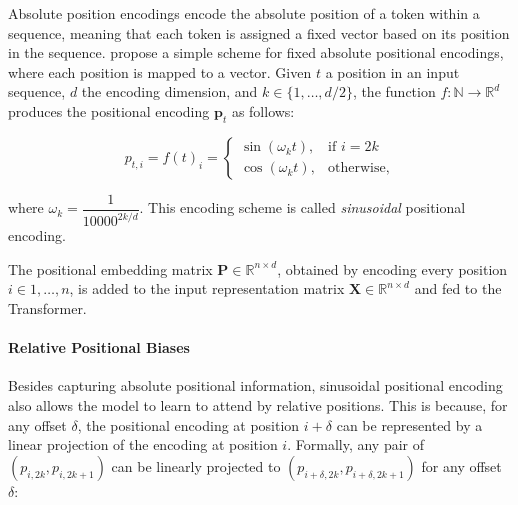 Absolute position encodings encode the absolute position of a token within a sequence, meaning that each token is assigned a fixed vector based on its position in the sequence. \citet{vaswani2017attention} propose a simple scheme for fixed absolute positional encodings, where each position is mapped to a vector. Given $t$ a position in an input sequence, $d$ the encoding dimension, and $k \in \{1, \ldots, d/2\}$, the function $f: \mathbb{N} \rightarrow \mathbb{R}^d$ produces the positional encoding $\bm{p}_t$ as follows:

\begin{equation}
    p_{t,i} = f(t)_i = 
\begin{cases}
    \sin(\omega_k t), & \text{if } i=2k\\
    \cos(\omega_k t),              & \text{otherwise},
\end{cases}
\end{equation}

where $\omega_k =\dfrac{1}{10000^{2k/d}}$. This encoding scheme is called \textit{sinusoidal} positional encoding.

The positional embedding matrix $\bm{P} \in \mathbb{R}^{n \times d}$, obtained by encoding every position $i \in {1, \ldots, n}$, is added to the input representation matrix $\bm{X} \in \mathbb{R}^{n \times d}$ and fed to the Transformer.



\paragraph{Relative Positional Biases} Besides capturing absolute positional information, sinusoidal positional encoding also allows the model to learn to attend by relative positions. This is because, for any offset $\delta$, the positional encoding at position $i + \delta$ can be represented by a linear projection of the encoding at position $i$. Formally, any pair of $(p_{i, 2k}, p_{i, 2k+1})$ can be linearly projected to $(p_{i + \delta, 2k}, p_{i + \delta, 2k+1})$ for any offset $\delta$:

